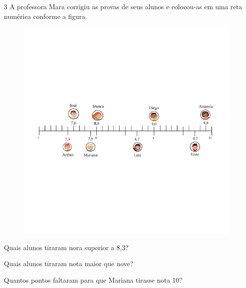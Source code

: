 
\num{3} A professora Mara corrigiu as provas de seus alunos e colocou-as em
uma reta numérica conforme a figura.

\begin{figure}[htpb!]
\includegraphics[width=\textwidth]{../ilustracoes/MAT5/SAEB_5ANO_MAT_figura87.png}
\end{figure}

\begin{escolha}
\item
  Quais alunos tiraram nora superior a 8,3?


\item
  Quais alunos tiraram nota maior que nove?


\item
  Quantos pontos faltaram para que Mariana tirasse nota 10?

\end{escolha}


